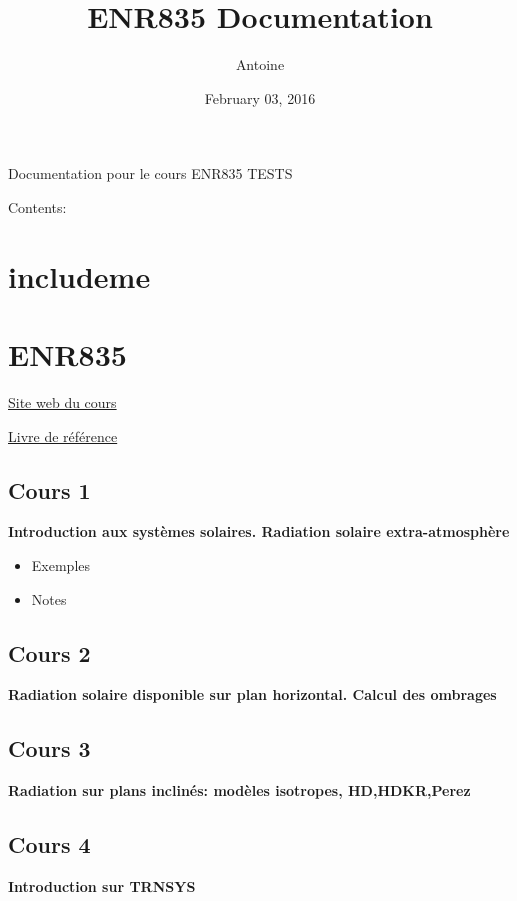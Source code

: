 \documentclass[letterpaper,10pt,english]{sphinxmanual}
\title{ENR835 Documentation}
\date{February 03, 2016}
\author{Antoine}
\begin{document}
\maketitle
\tableofcontents
{}\label{index::doc}


Documentation pour le cours ENR835
TESTS

Contents:


\chapter{includeme}
\label{includeme:enr835-technologies-des-systemes-solaires}\label{includeme:includeme}\label{includeme::doc}

\chapter{ENR835}
\label{ENR835::doc}\label{ENR835:enr835}
\href{https://ena.etsmtl.ca/course/view.php?id=3388/}{Site web du cours}

\href{http://gearju.com/225768904560/Data/Engineering/Solar/Solar\%20Engineering\%20of\%20Thermal\%20Processes,\%204th\%20Edition\%20-\%20GearTeam.pdf}{Livre de référence}


\section{Cours 1}
\label{ENR835:cours-1}
\textbf{Introduction aux systèmes solaires. Radiation solaire extra-atmosphère}
\begin{itemize}
\item {} 
Exemples

\item {} 
Notes

\end{itemize}


\section{Cours 2}
\label{ENR835:cours-2}
\textbf{Radiation solaire disponible sur plan horizontal.  Calcul des ombrages}


\section{Cours 3}
\label{ENR835:cours-3}
\textbf{Radiation sur plans inclinés:  modèles isotropes, HD,HDKR,Perez}


\section{Cours 4}
\label{ENR835:cours-4}
\textbf{Introduction sur TRNSYS}
\end{document}
